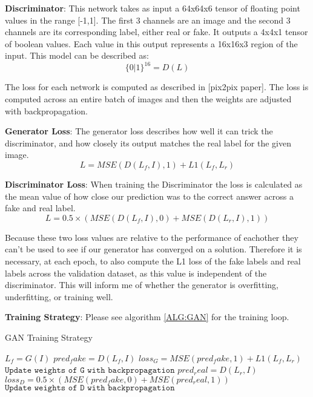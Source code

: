 \documentclass{UoYCSproject}
\begin{document}
\textbf{Discriminator}: This network takes as input a 64x64x6 tensor of floating point values in the range [-1,1]. The first 3 channels are an image and the second 3 channels are its corresponding label, either real or fake.
It outputs a 4x4x1 tensor of boolean values. Each value in this output represents a 16x16x3 region of the input.
This model can be described as: \[ \{0|1\}^{16} = D(L) \]

The loss for each network is computed as described in [pix2pix paper]. The loss is computed across an entire batch of images and then the weights are adjusted with backpropagation.

\textbf{Generator Loss}:
The generator loss describes how well it can trick the discriminator, and how closely its output matches the real label for the given image.
\[ L = MSE( D(L_{f}, I), 1 ) + L1(L_{f}, L_{r}) \]

\textbf{Discriminator Loss}: When training the Discriminator the loss is calculated as the mean value of how close our prediction was to the correct answer across a fake and real label.
\[ L = 0.5 \times  ( MSE( D( L_{f}, I ), 0) + MSE( D( L_{r}, I ), 1) ) \]

Because these two loss values are relative to the performance of eachother they can't be used to see if our generator has converged on a solution. Therefore it is necessary, at each epoch, to also compute the L1 loss of the fake labels and real labels across the validation dataset, as this value is independent of the discriminator. This will inform me of whether the generator is overfitting, underfitting, or training well. 

\textbf{Training Strategy}: Please see algorithm \ref{ALG:GAN} for the training loop.

\begin{algorithm}
\caption{GAN Training Strategy}\label{ALG:GAN}
\begin{algorithmic}[1]
\State
\State $L_{f} = G(I)$
\State
\State $pred_fake = D(L_{f}, I) $
\State $loss_G = MSE( pred_fake, 1 ) + L1(L_{f}, L_{r}) $
\State $\texttt{Update weights of G with backpropagation}$
\State
\State $pred_real = D(L_{r}, I)$
\State $loss_D = 0.5 \times  ( MSE( pred_fake, 0) + MSE( pred_real, 1) ) $
\State $\texttt{Update weights of D with backpropagation}$
\State
\EndFor
\EndFor
\end{algorithmic}
\end{algorithm}
\end{document}
